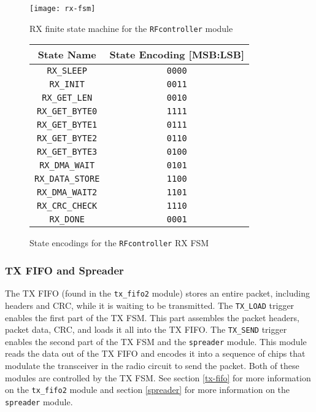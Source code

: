 \begin{figure}
	\centering
	\texttt{[image: rx-fsm]}
	\caption{RX finite state machine for the \texttt{RFcontroller} module}
	\label{fig:rx-fsm}
\end{figure}

\begin{figure}
	\centering
	\begin{tabular}{|c|c|}
		\hline
		State Name & State Encoding [MSB:LSB] \\
		\hline
		\texttt{RX\_SLEEP} & \texttt{0000} \\
		\texttt{RX\_INIT} & \texttt{0011} \\
		\texttt{RX\_GET\_LEN} & \texttt{0010} \\
		\texttt{RX\_GET\_BYTE0} & \texttt{1111} \\
		\texttt{RX\_GET\_BYTE1} & \texttt{0111} \\
		\texttt{RX\_GET\_BYTE2} & \texttt{0110} \\
		\texttt{RX\_GET\_BYTE3} & \texttt{0100} \\
		\texttt{RX\_DMA\_WAIT} & \texttt{0101} \\
		\texttt{RX\_DATA\_STORE} & \texttt{1100} \\
		\texttt{RX\_DMA\_WAIT2} & \texttt{1101} \\
		\texttt{RX\_CRC\_CHECK} & \texttt{1110} \\
		\texttt{RX\_DONE} & \texttt{0001} \\
		\hline
	\end{tabular}
	\caption{State encodings for the \texttt{RFcontroller} RX FSM}
	\label{table:rx-states}
\end{figure}

\subsubsection{TX FIFO and Spreader}
The TX FIFO (found in the \texttt{tx\_fifo2} module) stores an entire packet, including headers and CRC, while it is waiting to be transmitted. The \texttt{TX\_LOAD} trigger enables the first part of the TX FSM. This part assembles the packet headers, packet data, CRC, and loads it all into the TX FIFO. The \texttt{TX\_SEND} trigger enables the second part of the TX FSM and the \texttt{spreader} module. This module reads the data out of the TX FIFO and encodes it into a sequence of chips that modulate the transceiver in the radio circuit to send the packet. Both of these modules are controlled by the TX FSM. See section \ref{tx-fifo} for more information on the \texttt{tx\_fifo2} module and section \ref{spreader} for more information on the \texttt{spreader} module.

